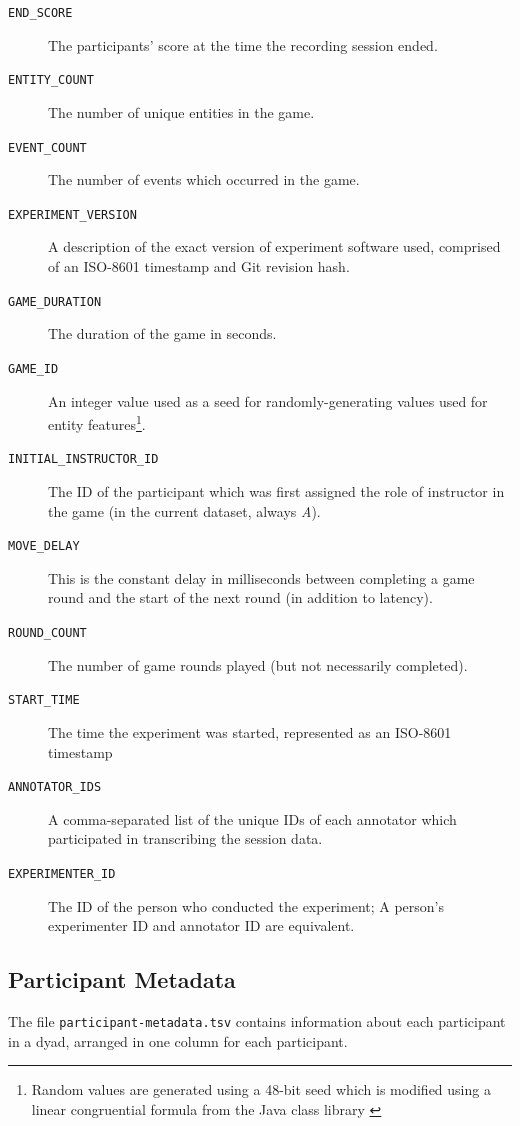 \documentclass[USenglish]{article}
\newcommand{\inlinecode}[1]{\texttt{#1}}	%
\begin{document}
\begin{description}
	\item[\inlinecode{END\_SCORE}] The participants' score at the time the recording session ended.
	\item[\inlinecode{ENTITY\_COUNT}] The number of unique entities in the game.
	\item[\inlinecode{EVENT\_COUNT}] The number of events which occurred in the game.
	\item[\inlinecode{EXPERIMENT\_VERSION}] A description of the exact version of experiment software used, comprised of an {ISO-8601} timestamp and Git revision hash.
	\item[\inlinecode{GAME\_DURATION}] The duration of the game in seconds.
	\item[\inlinecode{GAME\_ID}] An integer value used as a seed for randomly-generating values used for entity features\footnote{Random values are generated using a 48-bit seed which is modified using a linear congruential formula \cite[9--25]{Knuth:1981:ACP2} from the Java class library \cite{JavaSE8}}.
	\item[\inlinecode{INITIAL\_INSTRUCTOR\_ID}] The ID of the participant which was first assigned the role of instructor in the game (in the current dataset, always \emph{A}).
	\item[\inlinecode{MOVE\_DELAY}] This is the constant delay in milliseconds between completing a game round and the start of the next round (in addition to latency).
	\item[\inlinecode{ROUND\_COUNT}] The number of game rounds played (but not necessarily completed).
	\item[\inlinecode{START\_TIME}] The time the experiment was started, represented as an {ISO-8601} timestamp
	\item[\inlinecode{ANNOTATOR\_IDS}] A comma-separated list of the unique IDs of each annotator which participated in transcribing the session data.
	\item[\inlinecode{EXPERIMENTER\_ID}] The ID of the person who conducted the experiment; A person's experimenter ID and annotator ID are equivalent.
\end{description}

\subsection{Participant Metadata}

The file \inlinecode{participant-metadata.tsv} contains information about each participant in a dyad, arranged in one column for each participant.
\end{document}
